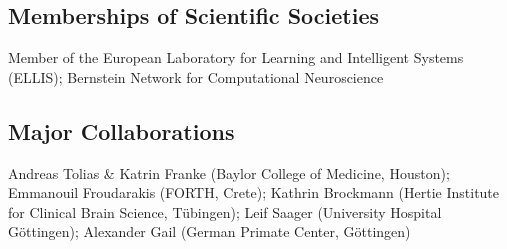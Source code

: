 \documentclass[COG,11pt]{ercgrant}
\begin{document}
\subsection{Memberships of Scientific Societies}
Member of the European Laboratory for Learning and Intelligent Systems (ELLIS); Bernstein Network for Computational Neuroscience

\subsection{Major Collaborations}
Andreas Tolias \& Katrin Franke (Baylor College of Medicine, Houston); ‪‪Emmanouil Froudarakis (FORTH, Crete); Kathrin Brockmann (Hertie Institute for Clinical Brain Science, Tübingen); Leif Saager (University Hospital Göttingen); Alexander Gail (German Primate Center, Göttingen) 

\newpage
\end{document}
